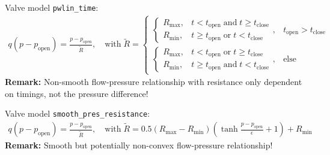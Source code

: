 \documentclass[a4paper,12pt]{report}
\begin{document}
Valve model \verb.pwlin_time.:
\begin{equation}
\begin{aligned}
q(p-p_{\mathrm{open}}) = \frac{p-p_{\mathrm{open}}}{\tilde{R}},\quad \text{with}\; \tilde{R} = \begin{cases} \begin{cases} R_{\max}, & t < t_{\mathrm{open}} \;\text{and}\; t \geq t_{\mathrm{close}} \\
R_{\min}, & t \geq t_{\mathrm{open}} \;\text{or}\; t < t_{\mathrm{close}} \end{cases}, & t_{\mathrm{open}} > t_{\mathrm{close}} \\ \begin{cases} R_{\max}, & t < t_{\mathrm{open}} \;\text{or}\; t \geq t_{\mathrm{close}} \\
R_{\min}, & t \geq t_{\mathrm{open}} \;\text{and}\; t < t_{\mathrm{close}} \end{cases}, & \text{else} \end{cases}
\end{aligned}
\end{equation}
\textbf{Remark:} Non-smooth flow-pressure relationship with resistance only dependent on timings, not the pressure difference!

Valve model \verb.smooth_pres_resistance.:
\begin{equation}
\begin{aligned}
q(p-p_{\mathrm{open}}) = \frac{p-p_{\mathrm{open}}}{\tilde{R}},\quad \text{with}\;\tilde{R} = 0.5\left(R_{\max}-R_{\min}\right)\left(\tanh\frac{p-p_{\mathrm{open}}}{\epsilon}+1\right) + R_{\min}
\end{aligned}
\end{equation}
\textbf{Remark:} Smooth but potentially non-convex flow-pressure relationship!
\end{document}
